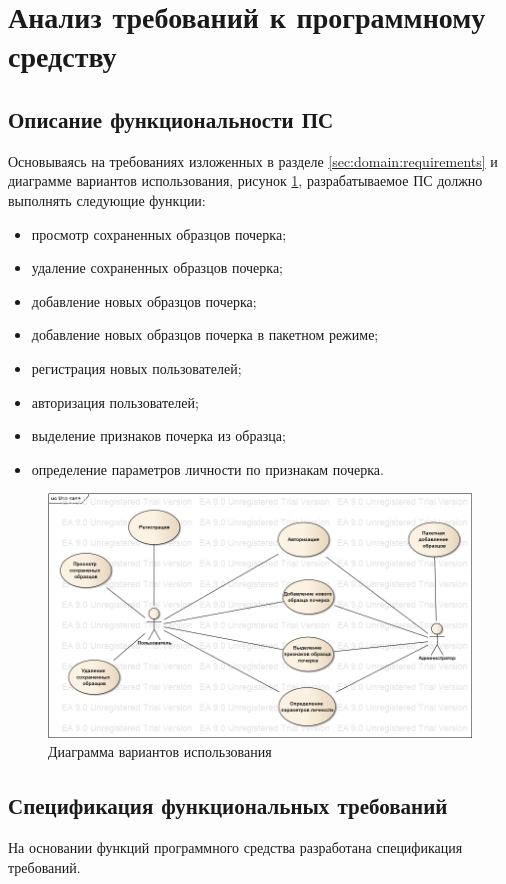 \section{Анализ требований к программному средству}
\label{sec:freq}
\subsection{Описание функциональности ПС}
Основываясь на требованиях изложенных в разделе \ref{sec:domain:requirements} и диаграмме вариантов использования, рисунок \ref{fig:freg:usecase}, разрабатываемое ПС должно выполнять следующие функции:
\begin{itemize}
	\item просмотр сохраненных образцов почерка;
	\item удаление сохраненных образцов почерка;
	\item добавление новых образцов почерка;
	\item добавление новых образцов почерка в пакетном режиме;
	\item регистрация новых пользователей;
	\item авторизация пользователей;
	\item выделение признаков почерка из образца;
	\item определение параметров личности по признакам почерка.
\end{itemize}

\begin{figure}[ht]
\centering
    \includegraphics[scale=0.53]{figures/use_case.png}  
    \caption{Диаграмма вариантов использования}
  \label{fig:freg:usecase}
\end{figure}

\subsection{Спецификация функциональных требований}
На основании функций программного средства разработана спецификация требований. 
